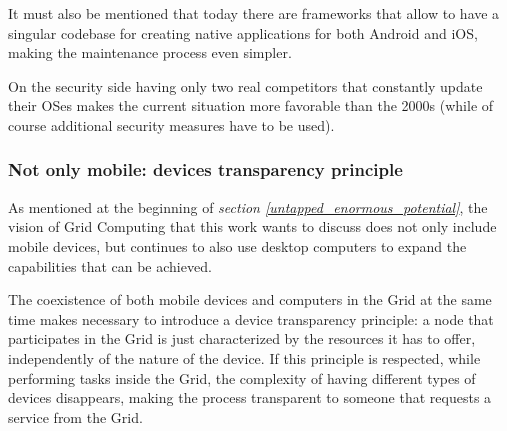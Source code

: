 It must also be mentioned that today there are frameworks that allow to have a singular codebase for creating native applications for both Android and iOS, making the maintenance process even simpler.

On the security side having only two real competitors that constantly update their OSes makes the current situation more favorable than the 2000s (while of course additional security measures have to be used).

\subsubsection{Not only mobile: devices transparency principle}
As mentioned at the beginning of \textit{section \ref{untapped_enormous_potential}}, the vision of Grid Computing that this work wants to discuss does not only include mobile devices, but continues to also use desktop computers to expand the capabilities that can be achieved.

The coexistence of both mobile devices and computers in the Grid at the same time makes necessary to introduce a device transparency principle: a node that participates in the Grid is just characterized by the resources it has to offer, independently of the nature of the device. If this principle is respected, while performing tasks inside the Grid, the complexity of having different types of devices disappears, making the process transparent to someone that requests a service from the Grid.

